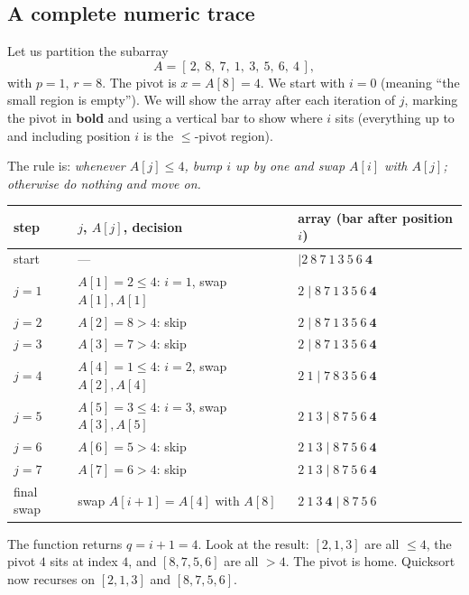 \subsection{A complete numeric trace}

Let us partition the subarray
\[
A = [\,2,\ 8,\ 7,\ 1,\ 3,\ 5,\ 6,\ 4\,],
\]
with $p = 1$, $r = 8$. The pivot is $x = A[8] = 4$. We start with $i = 0$
(meaning ``the small region is empty''). We will show the array after each
iteration of $j$, marking the pivot in \textbf{bold} and using a vertical bar to
show where $i$ sits (everything up to and including position $i$ is the
$\le$-pivot region).

\begin{labbox}
The rule is: \emph{whenever $A[j] \le 4$, bump
$i$ up by one and swap $A[i]$ with $A[j]$; otherwise do nothing and move on.}

\medskip
\begin{tabular}{lll}
\toprule
step & $j$, $A[j]$, decision & array (bar after position $i$) \\
\midrule
start & --- & $\mid 2\ 8\ 7\ 1\ 3\ 5\ 6\ \mathbf{4}$ \\
$j=1$ & $A[1]=2 \le 4$: $i{=}1$, swap $A[1],A[1]$ & $2 \mid 8\ 7\ 1\ 3\ 5\ 6\ \mathbf{4}$ \\
$j=2$ & $A[2]=8 > 4$: skip                        & $2 \mid 8\ 7\ 1\ 3\ 5\ 6\ \mathbf{4}$ \\
$j=3$ & $A[3]=7 > 4$: skip                        & $2 \mid 8\ 7\ 1\ 3\ 5\ 6\ \mathbf{4}$ \\
$j=4$ & $A[4]=1 \le 4$: $i{=}2$, swap $A[2],A[4]$ & $2\ 1 \mid 7\ 8\ 3\ 5\ 6\ \mathbf{4}$ \\
$j=5$ & $A[5]=3 \le 4$: $i{=}3$, swap $A[3],A[5]$ & $2\ 1\ 3 \mid 8\ 7\ 5\ 6\ \mathbf{4}$ \\
$j=6$ & $A[6]=5 > 4$: skip                        & $2\ 1\ 3 \mid 8\ 7\ 5\ 6\ \mathbf{4}$ \\
$j=7$ & $A[7]=6 > 4$: skip                        & $2\ 1\ 3 \mid 8\ 7\ 5\ 6\ \mathbf{4}$ \\
\midrule
final swap & swap $A[i+1]{=}A[4]$ with $A[8]$    & $2\ 1\ 3\ \mathbf{4} \mid 8\ 7\ 5\ 6$ \\
\bottomrule
\end{tabular}

\medskip
The function returns $q = i+1 = 4$. Look at the result:
$[2,1,3]$ are all $\le 4$, the pivot $4$ sits at index $4$, and $[8,7,5,6]$ are
all $> 4$. The pivot is home. Quicksort now recurses on $[2,1,3]$ and $[8,7,5,6]$.
\end{labbox}

